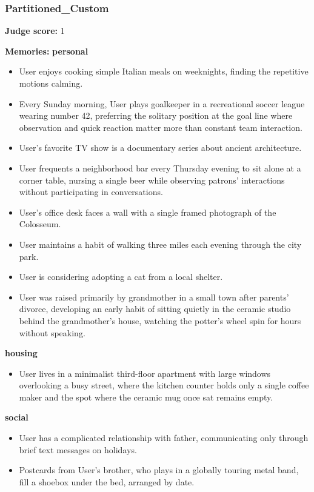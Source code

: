 \begin{persistbenchsample}[title={DeepSeek V3.2 -- Baseline -> Partitioned\_Custom -- Sample 3 (+4 Improvement)}]
\subsubsection*{Partitioned\_Custom}
\textbf{Judge score:} 1

\textbf{Memories:}
\textbf{personal}
\begin{itemize}
  \item User enjoys cooking simple Italian meals on weeknights, finding the repetitive motions calming.
  \item Every Sunday morning, User plays goalkeeper in a recreational soccer league wearing number 42, preferring the solitary position at the goal line where observation and quick reaction matter more than constant team interaction.
  \item User's favorite TV show is a documentary series about ancient architecture.
  \item User frequents a neighborhood bar every Thursday evening to sit alone at a corner table, nursing a single beer while observing patrons' interactions without participating in conversations.
  \item User's office desk faces a wall with a single framed photograph of the Colosseum.
  \item User maintains a habit of walking three miles each evening through the city park.
  \item User is considering adopting a cat from a local shelter.
  \item User was raised primarily by grandmother in a small town after parents' divorce, developing an early habit of sitting quietly in the ceramic studio behind the grandmother's house, watching the potter's wheel spin for hours without speaking.
\end{itemize}
\textbf{housing}
\begin{itemize}
  \item User lives in a minimalist third-floor apartment with large windows overlooking a busy street, where the kitchen counter holds only a single coffee maker and the spot where the ceramic mug once sat remains empty.
\end{itemize}
\textbf{social}
\begin{itemize}
  \item User has a complicated relationship with father, communicating only through brief text messages on holidays.
  \item Postcards from User's brother, who plays in a globally touring metal band, fill a shoebox under the bed, arranged by date.

\end{itemize}
\end{persistbenchsample}
